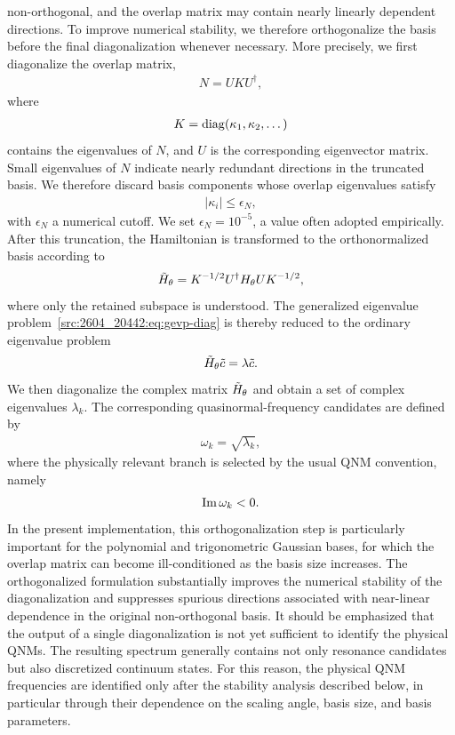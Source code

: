 non-orthogonal, and the overlap matrix may contain nearly linearly dependent
directions.
To improve numerical stability, we therefore orthogonalize the basis before
the final diagonalization whenever necessary.
More precisely, we first diagonalize the overlap matrix,
\begin{align}
    N = U K U^\dagger,
\end{align}
where
\begin{align}
    K = \operatorname{diag}(\kappa_1,\kappa_2,\dots)
\end{align}
contains the eigenvalues of $N$, and $U$ is the corresponding eigenvector
matrix.
Small eigenvalues of $N$ indicate nearly redundant directions in the truncated
basis.
We therefore discard basis components whose overlap eigenvalues satisfy
\begin{align}
    |\kappa_i| \le \epsilon_N,
\end{align}
with $\epsilon_N$ a numerical cutoff.
We set $\epsilon_N=10^{-5}$, a value often adopted empirically.
After this truncation, the Hamiltonian is transformed to the orthonormalized
basis according to
\begin{align}
    \Tilde{H}_\theta
    =
    K^{-1/2} U^\dagger H_\theta U K^{-1/2},
    \label{src:2604_20442:eq:orth-ham}
\end{align}
where only the retained subspace is understood.
The generalized eigenvalue problem~\eqref{src:2604_20442:eq:gevp-diag} is thereby reduced to
the ordinary eigenvalue problem
\begin{align}
    \Tilde{H}_\theta \Tilde{c} = \lambda \Tilde{c}.
    \label{src:2604_20442:eq:ordinary-evp}
\end{align}
We then diagonalize the complex matrix
$\Tilde{H}_\theta$
and obtain a set of complex eigenvalues $\lambda_k$.
The corresponding quasinormal-frequency candidates are defined by
\begin{align}
    \omega_k = \sqrt{\lambda_k},
\end{align}
where the physically relevant branch is selected by the usual QNM convention,
namely
\begin{align}
    \operatorname{Im} \omega_k < 0.
\end{align}
In the present implementation, this orthogonalization step is particularly
important for the polynomial and trigonometric Gaussian bases, for which the
overlap matrix can become ill-conditioned as the basis size increases.
The orthogonalized formulation substantially improves the numerical stability
of the diagonalization and suppresses spurious directions associated with
near-linear dependence in the original non-orthogonal basis.
It should be emphasized that the output of a single diagonalization is not yet
sufficient to identify the physical QNMs.
The resulting spectrum generally contains not only resonance candidates but
also discretized continuum states.
For this reason, the physical QNM frequencies are identified only after the
stability analysis described below, in particular through their dependence on
the scaling angle, basis size, and basis parameters.
